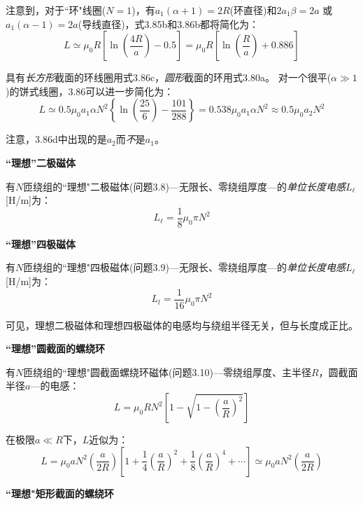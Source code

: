 注意到，对于``环"线圈($N=1$)，有$a_1(\alpha+1)=2R$(环直径)和$2a_1\beta=2a$
或$a_1(\alpha-1)=2a$(导线直径)，式3.85b和3.86b都将简化为：
\begin{equation*}
L\simeq\mu_0 R\left[\ln\left(\frac{4R}{a}\right)-0.5\right]=\mu_0 R\left[\ln\left(\frac{R}{a}\right)+0.886\right] \tag{3.86c}
\end{equation*}

具有\textit{长方形}截面的环线圈用式3.86c，\textit{圆形}截面的环用式3.80a。
对一个很平($\alpha\gg 1$)的饼式线圈，3.86可以进一步简化为：
\begin{equation*}
L  \simeq  0.5\mu_0a_1\alpha N^2\left\{\ln\left(\frac{25}{6}\right)-\frac{101}{288}\right\}=0.538\mu_0a_1\alpha N^2\approx 0.5\mu_0a_2N^2 \tag{3.86d}
\end{equation*}

注意，3.86d中出现的是$a_2$而\textit{不}是$a_1$。

\textbf{``理想''二极磁体}

有$N$匝绕组的``理想"二极磁体(问题3.8)---无限长、零绕组厚度---的\textit{单位长度电感}${L_\ell}$[H/m]为：
\begin{equation}
L_\ell=\frac{1}{8}\mu_0\pi N^2%
\end{equation}

\textbf{``理想''四极磁体}

有$N$匝绕组的``理想"四极磁体(问题3.9)---无限长、零绕组厚度---的\textit{单位长度电感}${L_\ell}$[H/m]为：
\begin{equation}
L_l=\frac{1}{16}\mu_0\pi N^2 %
\end{equation}

可见，理想二极磁体和理想四极磁体的电感均与绕组半径无关，但与长度成正比。

\textbf{``理想''圆截面的螺绕环}

有$N$匝绕组的``理想"圆截面螺绕环磁体(问题3.10)---零绕组厚度、主半径$R$，圆截面半径$a$---的电感：
  \begin{equation}
 L=\mu_0RN^2\left[1-\sqrt{1-\left(\frac{a}{R}\right)^2}\right]%
\end{equation}

在极限$a\ll R$下，$L$近似为：
\begin{equation*}
 L=\mu_0aN^2\left(\frac{a}{2R}\right)\left[1+\frac{1}{4}\left(\frac{a}{R}\right)^2+\frac{1}{8}\left(\frac{a}{R}\right)^4+\cdots\right]\simeq\mu_0aN^2\left(\frac{a}{2R}\right) \tag{3.89b}%
\end{equation*}

\textbf{``理想"矩形截面的螺绕环}

